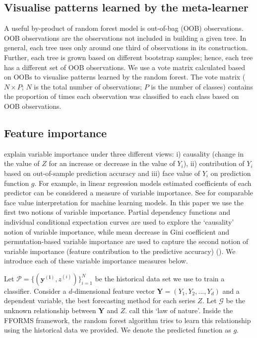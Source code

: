 \documentclass[11pt,a4paper,]{article}
\begin{document}
\hypertarget{visualise-patterns-learned-by-the-meta-learner}{%
\subsection{Visualise patterns learned by the meta-learner}\label{visualise-patterns-learned-by-the-meta-learner}}

A useful by-product of random forest model is out-of-bag (OOB) observations. OOB observations are the observations not included in building a given tree. In general, each tree uses only around one third of observations in its construction. Further, each tree is grown based on different bootstrap samples; hence, each tree has a different set of OOB observations. We use a vote matrix calculated based on OOBs to visualise patterns learned by the random forest. The vote matrix (\(N \times P\); \(N\) is the total number of observations; \(P\) is the number of classes) contains the proportion of times each observation was classified to each class based on OOB observations.

\hypertarget{feature-importance}{%
\subsection{Feature importance}\label{feature-importance}}

\textcite{jiang2002} explain variable importance under three different views: i) causality (change in the value of \(Z\) for an increase or decrease in the value of \(Y_i\)), ii) contribution of \(Y_i\) based on out-of-sample prediction accuracy and iii) face value of \(Y_i\) on prediction function \(g\). For example, in linear regression models estimated coefficients of each predictor can be considered a measure of variable importance. See \textcite{jiang2002} for comparable face value interpretation for machine learning models. In this paper we use the first two notions of variable importance. Partial dependency functions and individual conditional expectation curves are used to explore the `causality' notion of variable importance, while mean decrease in Gini coefficient and permutation-based variable importance are used to capture the second notion of variable importance (feature contribution to the predictive accuracy) (\textcite{Zhao}). We introduce each of these variable importance measures below.

Let \(\mathcal{P}=\{(\mathbf{y^{(i)}}, z^{(i)})\}_{i=1}^{N}\) be the
historical data set we use to train a classifier. Consider a
\(d\)-dimensional feature vector \(\mathbf{Y}=(Y_1, Y_2, ..., Y_d)\) and a dependent
variable, the best forecasting method for each series \(Z\). Let \(\mathcal{G}\) be the unknown relationship between \(\mathbf{Y}\) and
\(Z\). \textcite{Zhao} call this `law of nature'. Inside the FFORMS framework, the random forest algorithm tries to learn this relationship using
the historical data we provided. We denote the predicted function as
\(g\).
\end{document}

